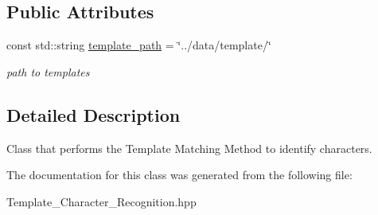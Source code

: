 \subsection*{Public Attributes}
\begin{DoxyCompactItemize}
\item 
\mbox{\label{class_image_processing_1_1_template___character___recognition_a2f7756520ceae78af0715328c70221b9}} 
const std\+::string \mbox{\hyperlink{class_image_processing_1_1_template___character___recognition_a2f7756520ceae78af0715328c70221b9}{template\+\_\+path}} = \char`\"{}../data/template/\char`\"{}
\begin{DoxyCompactList}\small\item\em path to templates \end{DoxyCompactList}\end{DoxyCompactItemize}


\subsection{Detailed Description}
Class that performs the Template Matching Method to identify characters. 

The documentation for this class was generated from the following file\+:\begin{DoxyCompactItemize}
\item 
Template\+\_\+\+Character\+\_\+\+Recognition.\+hpp\end{DoxyCompactItemize}

